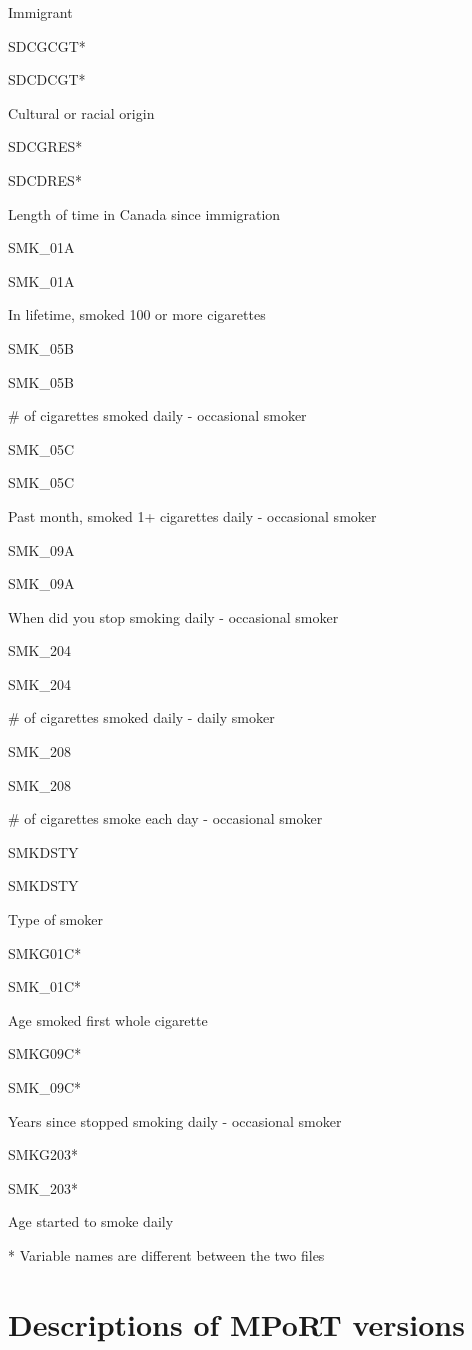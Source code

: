 \documentclass[]{book}
\begin{document}
Immigrant

SDCGCGT*

SDCDCGT*

Cultural or racial origin

SDCGRES*

SDCDRES*

Length of time in Canada since immigration

SMK\_01A

SMK\_01A

In lifetime, smoked 100 or more cigarettes

SMK\_05B

SMK\_05B

\# of cigarettes smoked daily - occasional smoker

SMK\_05C

SMK\_05C

Past month, smoked 1+ cigarettes daily - occasional smoker

SMK\_09A

SMK\_09A

When did you stop smoking daily - occasional smoker

SMK\_204

SMK\_204

\# of cigarettes smoked daily - daily smoker

SMK\_208

SMK\_208

\# of cigarettes smoke each day - occasional smoker

SMKDSTY

SMKDSTY

Type of smoker

SMKG01C*

SMK\_01C*

Age smoked first whole cigarette

SMKG09C*

SMK\_09C*

Years since stopped smoking daily - occasional smoker

SMKG203*

SMK\_203*

Age started to smoke daily

* Variable names are different between the two files

\section{Descriptions of MPoRT
versions}\label{descriptions-of-mport-versions}
\end{document}
